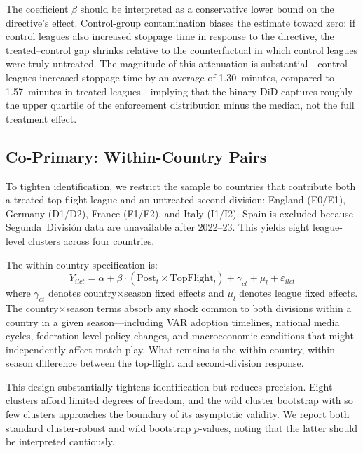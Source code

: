 The coefficient $\beta$ should be interpreted as a conservative lower
bound on the directive's effect. Control-group contamination biases
the estimate toward zero: if control leagues also increased stoppage
time in response to the directive, the treated--control gap shrinks
relative to the counterfactual in which control leagues were truly
untreated. The magnitude of this attenuation is substantial---control
leagues increased stoppage time by an average of 1.30~minutes,
compared to 1.57~minutes in treated leagues---implying that the
binary DiD captures roughly the upper quartile of the enforcement
distribution minus the median, not the full treatment effect.

\subsection{Co-Primary: Within-Country Pairs}

To tighten identification, we restrict the sample to countries that
contribute both a treated top-flight league and an untreated second
division: England (E0/E1), Germany (D1/D2), France (F1/F2), and Italy
(I1/I2). Spain is excluded because Segunda~Divisi\'{o}n data are
unavailable after 2022--23. This yields eight league-level clusters
across four countries.

The within-country specification is:
%
\begin{equation}\label{eq:within}
  Y_{ilct} = \alpha + \beta \cdot (\text{Post}_t \times \text{TopFlight}_l)
  + \gamma_{ct} + \mu_l + \varepsilon_{ilct}
\end{equation}
%
where $\gamma_{ct}$ denotes country$\times$season fixed effects and
$\mu_l$ denotes league fixed effects. The country$\times$season terms
absorb any shock common to both divisions within a country in a given
season---including VAR adoption timelines, national media cycles,
federation-level policy changes, and macroeconomic conditions that
might independently affect match play. What remains is the
within-country, within-season difference between the top-flight and
second-division response.

This design substantially tightens identification but reduces
precision. Eight clusters afford limited degrees of freedom, and the
wild cluster bootstrap with so few clusters approaches the boundary
of its asymptotic validity. We report both standard cluster-robust
and wild bootstrap $p$-values, noting that the latter should be
interpreted cautiously.

